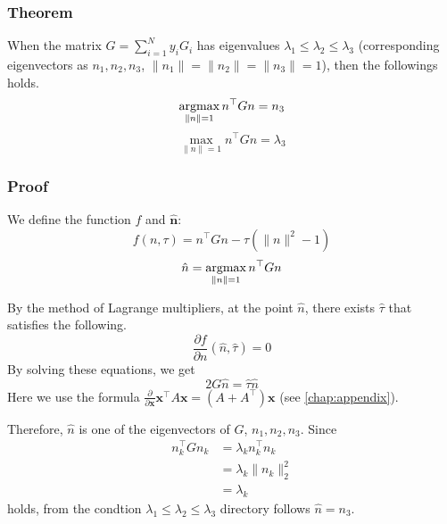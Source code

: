 \subsubsection{Theorem}
When the matrix $G=\sum_{i=1}^Ny_iG_i$ has eigenvalues $\lambda_1 \leq \lambda_2 \leq \lambda_3$ (corresponding
eigenvectors as $n_1, n_2, n_3$, $\|n_1\|= \|n_2\| = \|n_3\| = 1$), then the followings holds.
$$\argmax_{\|n\|=1} n^\top Gn = n_3$$
$$\max_{\|n\|=1} n^\top Gn = \lambda_3$$
\subsubsection{Proof}
We define the function $f$ and $\hat{\bm{n}}$:
$$f(n,\tau)=n^\top Gn-\tau(\|n\|^2-1)$$
$$\hat{n} = \argmax_{\|n\|=1} n^\top Gn$$

By the method of Lagrange multipliers, at the point $\hat{n}$, there exists 
$\hat{\tau}$ that satisfies the following.
$$\frac{\partial f}{\partial n}(\hat{n}, \hat{\tau} ) = 0$$
By solving these equations, we get
$$2G \hat{n} = \hat{\tau} \hat{n}$$
Here we use the formula $\frac{\partial }{\partial \bm{x}}\bm{x}^\top A\bm{x}=(A+A^\top)\bm{x}$ (see \ref{chap:appendix}).

\par Therefore, $\hat{n}$ is one of the eigenvectors of $G$, $n_1, n_2, n_3$.
Since 
$$\begin{aligned}
n_k^\top Gn_k&=\lambda_kn_k^\top n_k\\
&=\lambda_k\|n_k\|^2_2\\
&=\lambda_k
\end{aligned}$$
holds, from the condtion $\lambda_1\leq\lambda_2\leq\lambda_3$  directory follows $\hat{n}=n_3$.
